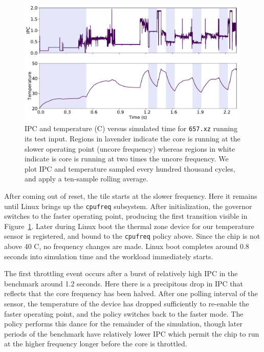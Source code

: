 \begin{figure}
    \centering
    \includegraphics[width=0.99\textwidth]{figures/pdes-demo-plot.pdf}
    \caption{IPC and temperature (C) versus simulated time for \texttt{657.xz} running its 
    test input. Regions in lavender indicate the core is running at the slower operating point (uncore frequency)
    whereas regions in white indicate is core is running at two times the uncore frequency. We plot IPC and temperature sampled
    every hundred thousand cycles, and apply a ten-sample rolling average.}
    \label{fig:pdes-demo-plot}
\end{figure}

After coming out of reset, the tile starts at the slower frequency. Here it
remains until Linux brings up the \texttt{cpufreq} subsystem.  After
initialization, the governor switches to the faster operating point, producing
the first transition visible in Figure~\ref{fig:pdes-demo-plot}.  Later during
Linux boot the thermal zone device for our temperature sensor is registered,
and bound to the \texttt{cpufreq} policy above. Since the chip is not above
40 C, no frequency changes are made. Linux boot completes around
0.8 seconds into simulation time and the workload immediately starts.

The first throttling event occurs after a burst of relatively high IPC in the benchmark around 1.2 seconds. Here there is a precipitous drop in IPC
that reflects that the core frequency has been halved. After one polling
interval of the sensor, the temperature of the device has dropped sufficiently
to re-enable the faster operating point, and the policy switches back to the
faster mode. The policy performs this dance for the remainder of the
simulation, though later periods of the benchmark have relatively lower IPC which permit the chip to
run at the higher frequency longer before the core is throttled.

